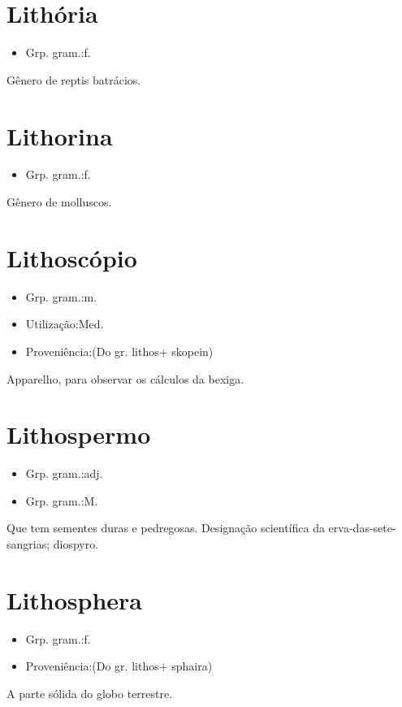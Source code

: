 \section{Lithória}
\begin{itemize}
\item {Grp. gram.:f.}
\end{itemize}
Gênero de reptis batrácios.
\section{Lithorina}
\begin{itemize}
\item {Grp. gram.:f.}
\end{itemize}
Gênero de molluscos.
\section{Lithoscópio}
\begin{itemize}
\item {Grp. gram.:m.}
\end{itemize}
\begin{itemize}
\item {Utilização:Med.}
\end{itemize}
\begin{itemize}
\item {Proveniência:(Do gr. \textunderscore lithos\textunderscore  + \textunderscore skopein\textunderscore )}
\end{itemize}
Apparelho, para observar os cálculos da bexiga.
\section{Lithospermo}
\begin{itemize}
\item {Grp. gram.:adj.}
\end{itemize}
\begin{itemize}
\item {Grp. gram.:M.}
\end{itemize}
Que tem sementes duras e pedregosas.
Designação scientífica da erva-das-sete-sangrias; diospyro.
\section{Lithosphera}
\begin{itemize}
\item {Grp. gram.:f.}
\end{itemize}
\begin{itemize}
\item {Proveniência:(Do gr. \textunderscore lithos\textunderscore  + \textunderscore sphaira\textunderscore )}
\end{itemize}
A parte sólida do globo terrestre.
